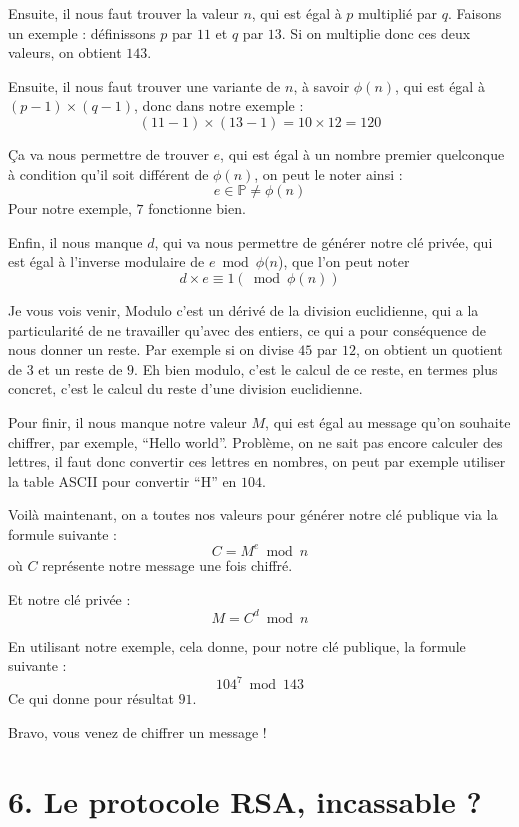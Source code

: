 \documentclass[
  paper=a4,
  ,captions=tableheading
]{scrartcl}
\begin{document}
Ensuite, il nous faut trouver la valeur \(n\), qui est égal à \(p\)
multiplié par \(q\). Faisons un exemple : définissons \(p\) par \(11\)
et \(q\) par \(13\). Si on multiplie donc ces deux valeurs, on obtient
\(143\).

Ensuite, il nous faut trouver une variante de \(n\), à savoir
\(\phi(n)\), qui est égal à \((p-1)\times(q-1)\), donc dans notre
exemple : \[(11-1)\times(13-1)=10\times12=120\]

Ça va nous permettre de trouver \(e\), qui est égal à un nombre premier
quelconque à condition qu'il soit différent de \(\phi(n)\), on peut le
noter ainsi : \[
e \in \mathbb{P}\ne \phi(n)
\] Pour notre exemple, \(7\) fonctionne bien.

Enfin, il nous manque \(d\), qui va nous permettre de générer notre clé
privée, qui est égal à l'inverse modulaire de \(e \bmod \phi(n\)), que
l'on peut noter \[d \times e \equiv 1 (\bmod \phi(n))\]

Je vous vois venir, Modulo c'est un dérivé de la division euclidienne,
qui a la particularité de ne travailler qu'avec des entiers, ce qui a
pour conséquence de nous donner un reste. Par exemple si on divise
\(45\) par \(12\), on obtient un quotient de \(3\) et un reste de \(9\).
Eh bien modulo, c'est le calcul de ce reste, en termes plus concret,
c'est le calcul du reste d'une division euclidienne.

Pour finir, il nous manque notre valeur \(M\), qui est égal au message
qu'on souhaite chiffrer, par exemple, ``Hello world''. Problème, on ne
sait pas encore calculer des lettres, il faut donc convertir ces lettres
en nombres, on peut par exemple utiliser la table ASCII pour convertir
``H'' en \(104\).

Voilà maintenant, on a toutes nos valeurs pour générer notre clé
publique via la formule suivante : \[
C = M^e \bmod n
\] où \(C\) représente notre message une fois chiffré.

Et notre clé privée : \[
M = C^d \bmod n
\]

En utilisant notre exemple, cela donne, pour notre clé publique, la
formule suivante : \[
104^{7} \bmod 143
\] Ce qui donne pour résultat \(91\).

Bravo, vous venez de chiffrer un message !

\section{6. Le protocole RSA, incassable
?}\label{le-protocole-rsa-incassable}
\end{document}
